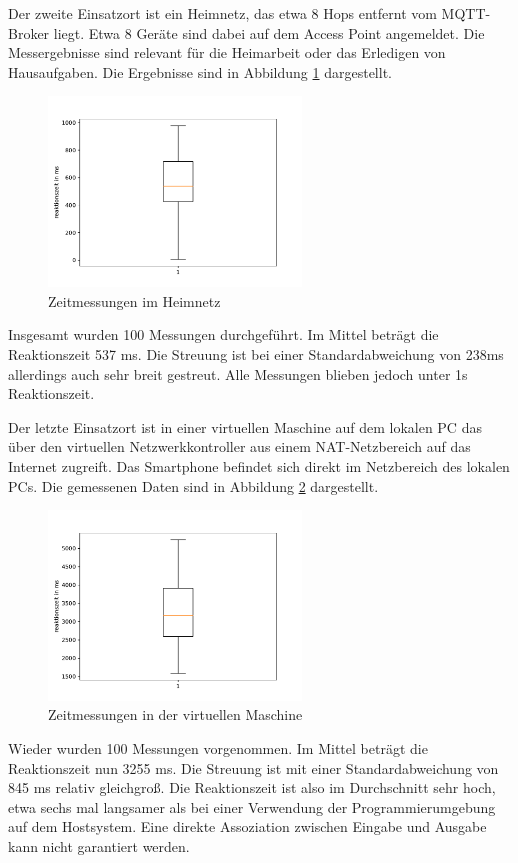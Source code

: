 \documentclass[11pt,a4paper]{report}
\begin{document}
Der zweite Einsatzort ist ein Heimnetz, das etwa 8 Hops entfernt vom MQTT-Broker liegt.
Etwa 8 Geräte sind dabei auf dem Access Point angemeldet.
Die Messergebnisse sind relevant für die Heimarbeit oder das Erledigen von Hausaufgaben.
Die Ergebnisse sind in Abbildung \ref{fig:measure_home} dargestellt.
\begin{figure}[htbp]
  \centering
  \includegraphics[width=0.6\textwidth]{images/timing_at_home}
  \caption{Zeitmessungen im Heimnetz}
  \label{fig:measure_home}
\end{figure}
Insgesamt wurden 100 Messungen durchgeführt.
Im Mittel beträgt die Reaktionszeit 537 ms.
Die Streuung ist bei einer Standardabweichung von 238ms allerdings auch sehr breit gestreut.
Alle Messungen blieben jedoch unter 1s Reaktionszeit.

Der letzte Einsatzort ist in einer virtuellen Maschine auf dem lokalen PC das über den virtuellen Netzwerkkontroller aus einem NAT-Netzbereich auf das Internet zugreift.
Das Smartphone befindet sich direkt im Netzbereich des lokalen PCs.
Die gemessenen Daten sind in Abbildung \ref{fig:measure_vm} dargestellt.
\begin{figure}[htbp]
  \centering
  \includegraphics[width=0.6\textwidth]{images/timing_vm}
  \caption{Zeitmessungen in der virtuellen Maschine}
  \label{fig:measure_vm}
\end{figure}
Wieder wurden 100 Messungen vorgenommen.
Im Mittel beträgt die Reaktionszeit nun 3255 ms.
Die Streuung ist mit einer Standardabweichung von 845 ms relativ gleichgroß.
Die Reaktionszeit ist also im Durchschnitt sehr hoch, etwa sechs mal langsamer als bei einer Verwendung der Programmierumgebung auf dem Hostsystem.
Eine direkte Assoziation zwischen Eingabe und Ausgabe kann nicht garantiert werden.
\end{document}
